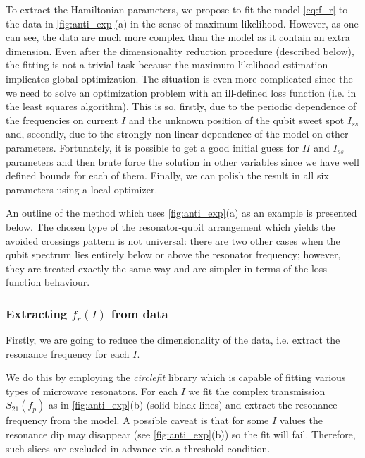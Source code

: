 \documentclass[%
 aip,
 amsmath,amssymb,
 reprint,%
]{revtex4-1}
\begin{document}
To extract the Hamiltonian parameters, we propose to fit the model \eqref{eq:f_r} to the data in \autoref{fig:anti_exp}(a) in the sense of maximum likelihood. However, as one can see, the data are much more complex than the model as it contain an extra dimension. Even after the dimensionality reduction procedure (described below), the fitting is not a trivial task because the maximum likelihood estimation implicates global optimization. The situation is even more complicated since the we need to solve an optimization problem with an ill-defined loss function (i.e. in the least squares algorithm). This is so, firstly, due to the periodic dependence of the frequencies on current $I$ and the unknown position of the qubit sweet spot $I_{ss}$ and, secondly, due to the strongly non-linear dependence of the model on other parameters. Fortunately, it is possible to get a good initial guess for $\Pi$ and $I_{ss}$ parameters and then brute force the solution in other variables since we have well defined bounds for each of them. Finally, we can polish the result in all six parameters using a local optimizer.

An outline of the method which uses \autoref{fig:anti_exp}(a) as an example is presented below. The chosen type of the resonator-qubit arrangement which yields the avoided crossings pattern is not universal: there are two other cases when the qubit spectrum lies entirely below or above the resonator frequency; however, they are treated exactly the same way and are simpler in terms of the loss function behaviour.

\subsubsection{Extracting $f_r(I)$ from data}\label{sec:extract_fr}

Firstly, we are going to reduce the dimensionality of the data, i.e. extract the resonance frequency for each $I$.

We do this by employing the \textit{circlefit}\cite{probst2015} library which is capable of fitting various types of microwave resonators. For each $I$ we fit the complex transmission $S_{21}(f_p)$ as in \autoref{fig:anti_exp}(b) (solid black lines) and extract the resonance frequency from the model. A possible caveat is that for some $I$ values the resonance dip may disappear (see \autoref{fig:anti_exp}(b)) so the fit will fail. Therefore, such slices are excluded in advance via a threshold condition.
\end{document}
